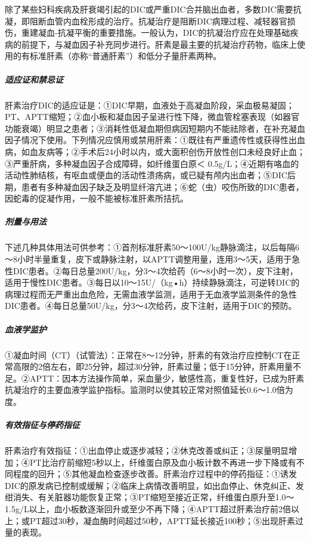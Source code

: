除了某些妇科疾病及肝衰竭引起的DIC或严重DIC合并脑出血者，多数DIC需要抗凝，即阻断血管内血栓形成的治疗。抗凝治疗是阻断DIC病理过程、减轻器官损伤，重建凝血-抗凝平衡的重要措施。一般认为，DIC的抗凝治疗应在处理基础疾病的前提下，与凝血因子补充同步进行。肝素是最主要的抗凝治疗药物，临床上使用的有标准肝素（亦称“普通肝素”）和低分子量肝素两种。

\subparagraph{适应证和禁忌证}

肝素治疗DIC的适应证是：①DIC早期，血液处于高凝血阶段，采血极易凝固；PT、APTT缩短；②血小板和凝血因子呈进行性下降，微血管栓塞表现（如器官功能衰竭）明显之患者；③消耗性低凝血期但病因短期内不能祛除者，在补充凝血因子情况下使用。下列情况应慎用或禁用肝素：①既往有严重遗传性或获得性出血病，如血友病等；②手术后24小时以内，或大面积创伤开放性创口未经良好止血；③严重肝病，多种凝血因子合成障碍，如纤维蛋白原＜
0.5g/L；④近期有咯血的活动性肺结核，有呕血或便血的活动性溃疡病，或已疑有颅内出血者；⑤DIC后期，患者有多种凝血因子缺乏及明显纤溶亢进；⑥蛇（虫）咬伤所致的DIC患者，因蛇毒的促凝作用，一般不能被标准肝素所拮抗。

\subparagraph{剂量与用法}

下述几种具体用法可供参考：①首剂标准肝素50～100U/kg静脉滴注，以后每隔6～8小时半量重复，皮下或静脉注射，以APTT调整用量，连用3～5天，适用于急性DIC患者。②每日总量200U/kg，分3～4次给药（6～8小时一次），皮下注射，适用于慢性DIC患者。③每日以10～15U/（kg•h）持续静脉滴注，可逆转DIC的病理过程而无严重出血危险，无需血液学监测，适用于无血液学监测条件的急性DIC患者。④每日总量50U/kg，分3～4次给药，皮下注射，适用于DIC的预防。

\subparagraph{血液学监护}

①凝血时间（CT）（试管法）：正常在8～12分钟，肝素的有效治疗应控制CT在正常高限的2倍左右，即25分钟，超过30分钟，肝素过量；低于15分钟，肝素用量不足。②APTT：因本方法操作简单，采血量少，敏感性高，重复性好，已成为肝素抗凝治疗的主要血液学监护指标。监测时以使其较正常对照值延长0.6～1.0倍为度。

\subparagraph{有效指征与停药指征}

肝素治疗有效指征：①出血停止或逐步减轻；②休克改善或纠正；③尿量明显增加；④PT比治疗前缩短5秒以上，纤维蛋白原及血小板计数不再进一步下降或有不同程度的回升；⑤其他凝血检查逐步改善。肝素治疗过程中的停药指征：①诱发DIC的原发病已控制或缓解；②临床上病情改善明显，如出血停止、休克纠正、发绀消失、有关脏器功能恢复正常；③PT缩短至接近正常，纤维蛋白原升至1.0～1.5g/L以上，血小板数逐渐回升或至少不再下降；④APTT超过肝素治疗前2倍以上；或PT超过30秒，凝血酶时间超过50秒，APTT延长接近100秒；⑤出现肝素过量的表现。

